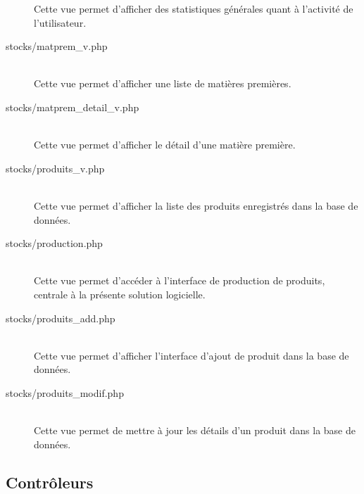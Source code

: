 \begin{description}
                Cette vue permet d'afficher des statistiques générales quant
                à l'activité de l'utilisateur.
            \item[stocks/matprem\_v.php]\hfill \\
                Cette vue permet d'afficher une liste de matières premières.
            \item[stocks/matprem\_detail\_v.php]\hfill \\
                Cette vue permet d'afficher le détail d'une matière première.
            \item[stocks/produits\_v.php]\hfill \\
                Cette vue permet d'afficher la liste des produits enregistrés
                dans la base de données.
            \item[stocks/production.php]\hfill \\
                Cette vue permet d'accéder à l'interface de production de
                produits, centrale à la présente solution logicielle.
            \item[stocks/produits\_add.php]\hfill \\
                Cette vue permet d'afficher l'interface d'ajout de produit
                dans la base de données.
            \item[stocks/produits\_modif.php]\hfill \\
                Cette vue permet de mettre à jour les détails d'un produit
                dans la base de données.
        \end{description}

    \subsection{Contrôleurs}
